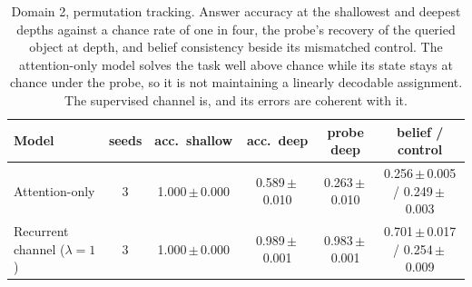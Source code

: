 \begin{table}[t]
\centering\small
\caption{Domain 2, permutation tracking. Answer accuracy at the shallowest
and deepest depths against a chance rate of one in four, the probe's
recovery of the queried object at depth, and belief consistency beside its
mismatched control. The attention-only model solves the task well above
chance while its state stays at chance under the probe, so it is not
maintaining a linearly decodable assignment. The supervised channel is, and
its errors are coherent with it.}
\label{tab:boxes}
\begin{tabular}{lccccc}
\toprule
Model & seeds & acc.\ shallow & acc.\ deep & probe deep & belief / control \\
\midrule
Attention-only & 3 & 1.000\,$\pm$\,0.000 & 0.589\,$\pm$\,0.010 & 0.263\,$\pm$\,0.010 & 0.256\,$\pm$\,0.005 / 0.249\,$\pm$\,0.003 \\
Recurrent channel ($\lambda{=}1$) & 3 & 1.000\,$\pm$\,0.000 & 0.989\,$\pm$\,0.001 & 0.983\,$\pm$\,0.001 & 0.701\,$\pm$\,0.017 / 0.254\,$\pm$\,0.009 \\
\bottomrule
\end{tabular}
\end{table}
